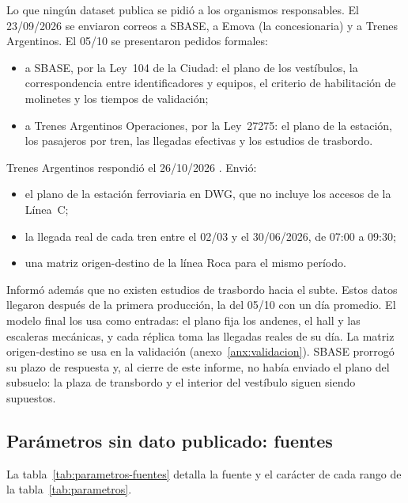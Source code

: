 Lo que ningún dataset publica se pidió a los organismos responsables. El 23/09/2026 se enviaron correos
a SBASE, a Emova (la concesionaria) y a Trenes Argentinos. El 05/10 se presentaron pedidos formales:
\begin{itemize}
  \item a SBASE, por la Ley~104 de la Ciudad: el plano de los vestíbulos, la correspondencia entre
        identificadores y equipos, el criterio de habilitación de molinetes y los tiempos de validación;
  \item a Trenes Argentinos Operaciones, por la Ley~\num{27275}: el plano de la estación, los pasajeros
        por tren, las llegadas efectivas y los estudios de trasbordo.
\end{itemize}

Trenes Argentinos respondió el 26/10/2026 \parencite{sofse2026nota}. Envió:
\begin{itemize}
  \item el plano de la estación ferroviaria en DWG, que no incluye los accesos de la Línea~C;
  \item la llegada real de cada tren entre el 02/03 y el 30/06/2026, de 07:00 a 09:30;
  \item una matriz origen-destino de la línea Roca para el mismo período.
\end{itemize}
Informó además que no existen estudios de trasbordo hacia el subte. Estos datos llegaron después de la
primera producción, la del 05/10 con un día promedio. El modelo final los usa como entradas: el plano fija los
andenes, el hall y las escaleras mecánicas, y cada réplica toma las llegadas reales de su día. La matriz
origen-destino se usa en la validación (anexo~\ref{anx:validacion}). SBASE prorrogó su plazo de
respuesta y, al cierre de este informe, no había enviado el plano del subsuelo: la plaza de transbordo y el
interior del vestíbulo siguen siendo supuestos.

\subsection{Parámetros sin dato publicado: fuentes}
\label{anx:parametros-fuentes}

La tabla~\ref{tab:parametros-fuentes} detalla la fuente y el carácter de cada rango de la
tabla~\ref{tab:parametros}.

